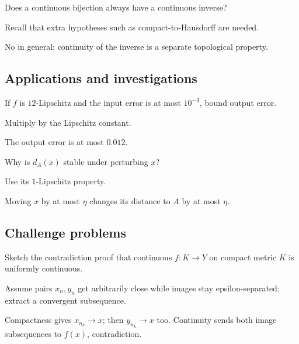 \begin{exercise}\label{exr:ii05-expand-12}
Does a continuous bijection always have a continuous inverse?
\end{exercise}
\begin{hint}
Recall that extra hypotheses such as compact-to-Hausdorff are needed.
\end{hint}
\begin{solution}
No in general; continuity of the inverse is a separate topological property.
\end{solution}

\subsection*{Applications and investigations}

\begin{exercise}\label{exr:ii05-expand-13}
If \(f\) is \(12\)-Lipschitz and the input error is at most \(10^{-3}\), bound output error.
\end{exercise}
\begin{hint}
Multiply by the Lipschitz constant.
\end{hint}
\begin{solution}
The output error is at most \(0.012\).
\end{solution}

\begin{exercise}\label{exr:ii05-expand-14}
Why is \(d_A(x)\) stable under perturbing \(x\)?
\end{exercise}
\begin{hint}
Use its \(1\)-Lipschitz property.
\end{hint}
\begin{solution}
Moving \(x\) by at most \(\eta\) changes its distance to \(A\) by at most \(\eta\).
\end{solution}

\subsection*{Challenge problems}

\begin{exercise}\label{exr:ii05-expand-15}
Sketch the contradiction proof that continuous \(f:K\to Y\) on compact metric \(K\) is uniformly continuous.
\end{exercise}
\begin{hint}
Assume pairs \(x_n,y_n\) get arbitrarily close while images stay epsilon-separated; extract a convergent subsequence.
\end{hint}
\begin{solution}
Compactness gives \(x_{n_k}\to x\); then \(y_{n_k}\to x\) too. Continuity sends both image subsequences to \(f(x)\), contradiction.
\end{solution}

